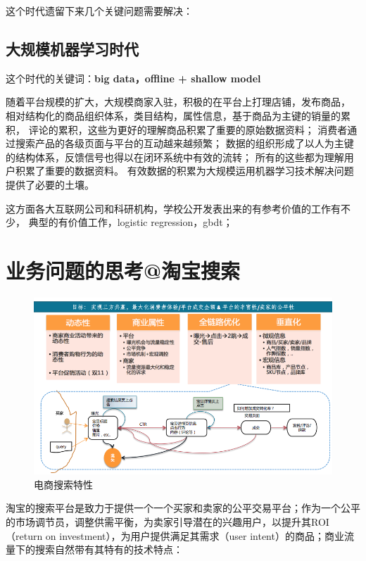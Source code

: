 这个时代遗留下来几个关键问题需要解决：
\begin{description}
	\item 
\end{description}

\subsection{大规模机器学习时代}
这个时代的关键词：\textbf{big data，offline + shallow model}

随着平台规模的扩大，大规模商家入驻，积极的在平台上打理店铺，发布商品，
相对结构化的商品组织体系，类目结构，属性信息，基于商品为主键的销量的累积，
评论的累积，这些为更好的理解商品积累了重要的原始数据资料；
消费者通过搜索产品的各级页面与平台的互动越来越频繁；
数据的组织形成了以人为主键的结构体系，反馈信号也得以在闭环系统中有效的流转；
所有的这些都为理解用户积累了重要的数据资料。
有效数据的积累为大规模运用机器学习技术解决问题提供了必要的土壤。

这方面各大互联网公司和科研机构，学校公开发表出来的有参考价值的工作有不少，
典型的有价值工作，logistic regression，gbdt； 


\section{业务问题的思考@淘宝搜索} 

\begin{figure}[h]
\centering
\includegraphics[totalheight=3.0in]{fig/searchProdFea.png}
\caption{电商搜索特性} \label{fig:gansamples}
\end{figure}

淘宝的搜索平台是致力于提供一个一个买家和卖家的公平交易平台；作为一个公平的市场调节员，调整供需平衡，为卖家引导潜在的兴趣用户，以提升其ROI（return on investment），为用户提供满足其需求（user intent）的商品；商业流量下的搜索自然带有其特有的技术特点：

